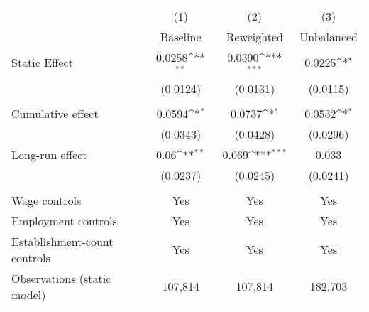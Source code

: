 {
\def\sym#1{\ifmmode^{#1}\else\(^{#1}\)\fi}
\begin{tabular}{l*{3}{c}}
\hline\hline
          &\multicolumn{1}{c}{(1)}&\multicolumn{1}{c}{(2)}&\multicolumn{1}{c}{(3)}\\
          &\multicolumn{1}{c}{Baseline}&\multicolumn{1}{c}{Reweighted}&\multicolumn{1}{c}{Unbalanced}\\
\hline
Static Effect&   0.0258\sym{**} &   0.0390\sym{***}&   0.0225\sym{*}  \\
          & (0.0124)         & (0.0131)         & (0.0115)         \\
\hline
\vspace{-2mm}&                  &                  &                  \\
Cumulative effect&0.0594\sym{*}         &0.0737\sym{*}         &0.0532\sym{*}         \\
          & (0.0343)         & (0.0428)         & (0.0296)         \\
Long-run effect&0.06\sym{**}         &0.069\sym{***}         &    0.033         \\
          & (0.0237)         & (0.0245)         & (0.0241)         \\
\hline    &                  &                  &                  \\
Wage controls&      Yes         &      Yes         &      Yes         \\
Employment controls&      Yes         &      Yes         &      Yes         \\
Establishment-count controls&      Yes         &      Yes         &      Yes         \\
Observations (static model)&  107,814         &  107,814         &  182,703         \\
\hline\hline
\end{tabular}
}
